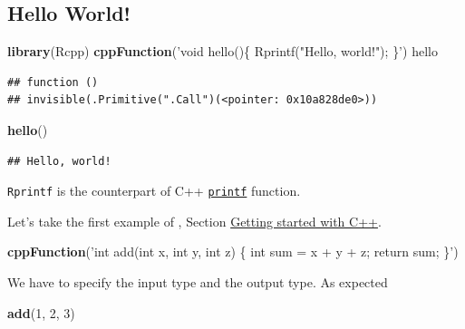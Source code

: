 \documentclass[]{book}
\newenvironment{Shaded}{\begin{snugshade}}{\end{snugshade}}
\newcommand{\KeywordTok}[1]{\textcolor[rgb]{0.13,0.29,0.53}{\textbf{#1}}}
\newcommand{\DecValTok}[1]{\textcolor[rgb]{0.00,0.00,0.81}{#1}}
\newcommand{\StringTok}[1]{\textcolor[rgb]{0.31,0.60,0.02}{#1}}
\newcommand{\NormalTok}[1]{#1}
\theoremstyle{definition}
\theoremstyle{definition}
\theoremstyle{definition}
\theoremstyle{remark}
\begin{document}
\subsection{Hello World!}\label{hello-world}

\begin{Shaded}
\begin{Highlighting}[]
\KeywordTok{library}\NormalTok{(Rcpp)}
\KeywordTok{cppFunction}\NormalTok{(}\StringTok{'void hello()\{}
\StringTok{  Rprintf("Hello, world!");}
\StringTok{\}'}\NormalTok{)}
\NormalTok{hello}
\end{Highlighting}
\end{Shaded}

\begin{verbatim}
## function () 
## invisible(.Primitive(".Call")(<pointer: 0x10a828de0>))
\end{verbatim}

\begin{Shaded}
\begin{Highlighting}[]
\KeywordTok{hello}\NormalTok{()}
\end{Highlighting}
\end{Shaded}

\begin{verbatim}
## Hello, world!
\end{verbatim}

\texttt{Rprintf} is the counterpart of C++
\href{http://www.cplusplus.com/reference/cstdio/printf/}{\texttt{printf}}
function.

Let's take the first example of \citet{Wickham2014}, Section
\href{http://adv-r.had.co.nz/Rcpp.html\#rcpp-intro}{Getting started with
C++}.

\begin{Shaded}
\begin{Highlighting}[]
\KeywordTok{cppFunction}\NormalTok{(}\StringTok{'int add(int x, int y, int z) \{}
\StringTok{  int sum = x + y + z;}
\StringTok{  return sum;}
\StringTok{\}'}\NormalTok{)}
\end{Highlighting}
\end{Shaded}

We have to specify the input type and the output type. As expected

\begin{Shaded}
\begin{Highlighting}[]
\KeywordTok{add}\NormalTok{(}\DecValTok{1}\NormalTok{, }\DecValTok{2}\NormalTok{, }\DecValTok{3}\NormalTok{)}
\end{Highlighting}
\end{Shaded}
\end{document}
